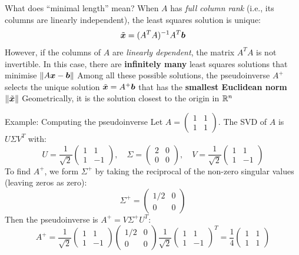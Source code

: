\documentclass[aspectratio=169]{beamer}\usepackage[]{graphicx}\usepackage[]{xcolor}
\begin{document}
\begin{frame}{What does ``minimal length'' mean?}
When $A$ has \emph{full column rank} (i.e., its columns are linearly independent), the least squares solution is unique:
\[
\tilde{\bm{x}} = (A^T A)^{-1} A^T \bm{b}
\]
However, if the columns of $A$ are \emph{linearly dependent}, the matrix $A^T A$ is not invertible. In this case, there are \textbf{infinitely many} least squares solutions that minimise $\|A\bm{x} - \bm{b}\|$ 
\vfill
Among all these possible solutions, the pseudoinverse $A^+$ selects the unique solution $\tilde{\bm{x}} = A^+\bm{b}$ that has the \textbf{smallest Euclidean norm} $\|\tilde{\bm{x}}\|$
\vfill
Geometrically, it is the solution closest to the origin in $\mathbb{R}^n$
\end{frame}

\begin{frame}{Example: Computing the pseudoinverse}
Let $A = \begin{pmatrix} 1 & 1 \\ 1 & 1 \end{pmatrix}$. The SVD of $A$ is $U\Sigma V^T$ with:
\[
U = \frac{1}{\sqrt{2}}\begin{pmatrix} 1 & 1 \\ 1 & -1 \end{pmatrix},\quad
\Sigma = \begin{pmatrix} 2 & 0 \\ 0 & 0 \end{pmatrix},\quad
V = \frac{1}{\sqrt{2}}\begin{pmatrix} 1 & 1 \\ 1 & -1 \end{pmatrix}
\]
\vfill
To find $A^+$, we form $\Sigma^+$ by taking the reciprocal of the non-zero singular values (leaving zeros as zero):
\[
\Sigma^+ = \begin{pmatrix} 1/2 & 0 \\ 0 & 0 \end{pmatrix}
\]
\vfill
Then the pseudoinverse is $A^+ = V\Sigma^+ U^T$:
\[
A^+ = \frac{1}{\sqrt{2}}\begin{pmatrix} 1 & 1 \\ 1 & -1 \end{pmatrix} \begin{pmatrix} 1/2 & 0 \\ 0 & 0 \end{pmatrix} \frac{1}{\sqrt{2}}\begin{pmatrix} 1 & 1 \\ 1 & -1 \end{pmatrix}^T = \frac{1}{4}\begin{pmatrix} 1 & 1 \\ 1 & 1 \end{pmatrix}
\]
\end{frame}
\end{document}
